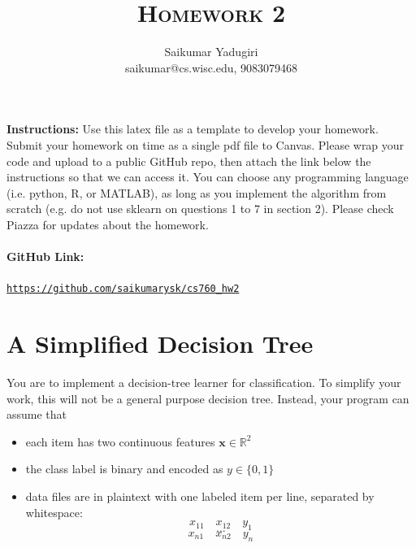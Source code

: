 \documentclass[a4paper]{article}
\title{\textsc{Homework 2}} %
\author{
Saikumar Yadugiri \\
saikumar@cs.wisc.edu, 9083079468\\
}
\date{}
\theoremstyle{definition}
\newcommand{\RR}{\mathbb{R}}
\def\x{\mathbf x}
\begin{document}
\maketitle 


\textbf{Instructions:} 
Use this latex file as a template to develop your homework. Submit your homework on time as a single pdf file to Canvas. Please wrap your code and upload to a public GitHub repo, then attach the link below the instructions so that we can access it. You can choose any programming language (i.e. python, R, or MATLAB), as long as you implement the algorithm from scratch (e.g. do not use sklearn on questions 1 to 7 in section 2). Please check Piazza for updates about the homework.

\paragraph{GitHub Link:} \href{https://github.com/saikumarysk/cs760_hw2}{\texttt{https://github.com/saikumarysk/cs760\_hw2}}

\section{A Simplified Decision Tree}
You are to implement a decision-tree learner for classification.
To simplify your work, this will not be a general purpose decision tree.  Instead, your program can assume that
\begin{itemize}
\item each item has two continuous features $\x \in \RR^2$
\item the class label is binary and encoded as $y \in \{0,1\}$
\item data files are in plaintext with one labeled item per line, separated by whitespace:
$$x_{11} \quad x_{12} \quad y_1$$
$$...$$
$$x_{n1} \quad x_{n2} \quad y_n$$
\end{itemize}
\end{document}
